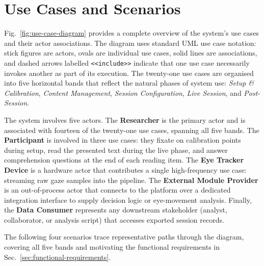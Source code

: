 \section{Use Cases and Scenarios}
\label{sec:use-cases}

Fig.~\ref{fig:use-case-diagram} provides a complete overview of the system's use cases
and their actor associations.
The diagram uses standard UML use case notation: stick figures are actors, ovals are
individual use cases, solid lines are associations, and dashed arrows labelled
\texttt{<<include>>} indicate that one use case necessarily invokes another as part
of its execution.
The twenty-one use cases are organised into five horizontal bands that reflect the
natural phases of system use: \textit{Setup \& Calibration}, \textit{Content Management},
\textit{Session Configuration}, \textit{Live Session}, and \textit{Post-Session}.

The system involves five actors.
The \textbf{Researcher} is the primary actor and is associated with fourteen of the
twenty-one use cases, spanning all five bands.
The \textbf{Participant} is involved in three use cases: they fixate on calibration
points during setup, read the presented text during the live phase, and answer
comprehension questions at the end of each reading item.
The \textbf{Eye Tracker Device} is a hardware actor that contributes a single
high-frequency use case: streaming raw gaze samples into the pipeline.
The \textbf{External Module Provider} is an out-of-process actor that connects to the
platform over a dedicated integration interface to supply decision logic or eye-movement analysis.
Finally, the \textbf{Data Consumer} represents any downstream stakeholder (analyst,
collaborator, or analysis script) that accesses exported session records.

The following four scenarios trace representative paths through the diagram, covering
all five bands and motivating the functional requirements in
Sec.~\ref{sec:functional-requirements}.

\usetikzlibrary{shapes.geometric}

